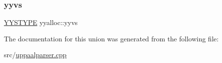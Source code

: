 \mbox{\label{unionyyalloc_a9494cc8d8cd0eba1b44ca20fe89de5d2}} 
\subsubsection{\texorpdfstring{yyvs}{yyvs}}
{\footnotesize\ttfamily \mbox{\hyperlink{union_y_y_s_t_y_p_e}{Y\+Y\+S\+T\+Y\+PE}} yyalloc\+::yyvs}



The documentation for this union was generated from the following file\+:\begin{DoxyCompactItemize}
\item 
src/\mbox{\hyperlink{uppaalparser_8cpp}{uppaalparser.\+cpp}}\end{DoxyCompactItemize}
